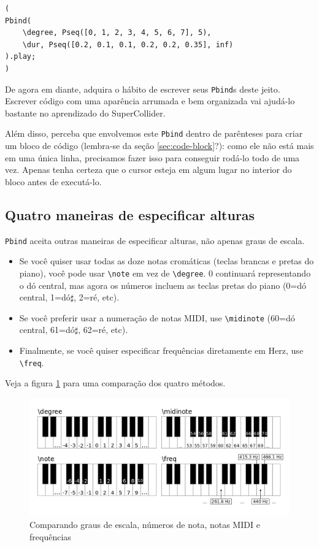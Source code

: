\begin{lstlisting}[style=SuperCollider-IDE, basicstyle=\scttfamily\footnotesize]
(
Pbind(
	\degree, Pseq([0, 1, 2, 3, 4, 5, 6, 7], 5),
	\dur, Pseq([0.2, 0.1, 0.1, 0.2, 0.2, 0.35], inf)
).play;
)
\end{lstlisting}

De agora em diante, adquira o hábito de escrever seus \texttt{Pbind}s deste jeito. Escrever código com uma aparência arrumada e bem organizada vai ajudá-lo bastante no aprendizado do SuperCollider.

Além disso, perceba que envolvemos este \texttt{Pbind} dentro de parênteses para criar um bloco de código (lembra-se da seção \ref{sec:code-block}?): como ele não está mais em uma única linha, precisamos fazer isso para conseguir rodá-lo todo de uma vez. Apenas tenha certeza que o cursor esteja em algum lugar no interior do bloco antes de executá-lo.


\subsection{Quatro maneiras de especificar alturas}

\texttt{Pbind} aceita outras maneiras de especificar alturas, não apenas graus de escala.
\begin{itemize}
\item Se você quiser usar todas as doze notas cromáticas (teclas brancas e pretas do piano), você pode usar \texttt{\textbackslash note} em vez de \texttt{\textbackslash degree}. 0 continuará representando o dó central, mas agora os números incluem as teclas pretas do piano (0=dó central, 1=dó$\sharp$, 2=ré, etc).
\item Se você preferir usar a numeração de notas MIDI, use \texttt{\textbackslash midinote} (60=dó central, 61=dó$\sharp$, 62=ré, etc).
\item Finalmente, se você quiser especificar frequências diretamente em Herz, use \texttt{\textbackslash freq}.
\end{itemize}

Veja a figura \ref{fig:scale-degrees} para uma comparação dos quatro métodos.

\begin{figure}[h]
\centering
\includegraphics[scale=0.4]{fig-piano-keyboard-degree-note-midinote-freq.png}
\caption{Comparando graus de escala, números de nota, notas MIDI e frequências}
\label{fig:scale-degrees}
\end{figure}

